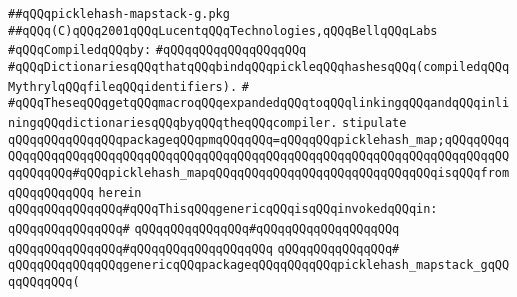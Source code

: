 \label{src/lib/compiler/front/basics/map/picklehash-mapstack-g.pkg}
\verb|##qQQqpicklehash-mapstack-g.pkg|\newline
\verb|##qQQq(C)qQQq2001qQQqLucentqQQqTechnologies,qQQqBellqQQqLabs|\newline
\newline
\verb|#qQQqCompiledqQQqby:|\newline
\verb|#qQQqqQQqqQQqqQQqqQQq|\newline
\newline
\newline
\newline
\verb|#qQQqDictionariesqQQqthatqQQqbindqQQqpickleqQQqhashesqQQq(compiledqQQqMythrylqQQqfileqQQqidentifiers).|\newline
\verb|#|\newline
\verb|#qQQqTheseqQQqgetqQQqmacroqQQqexpandedqQQqtoqQQqlinkingqQQqandqQQqinliningqQQqdictionariesqQQqbyqQQqtheqQQqcompiler.|\newline
\newline
\newline
\newline
\verb|stipulate|\newline
\verb|qQQqqQQqqQQqqQQqpackageqQQqpmqQQqqQQq=qQQqqQQqpicklehash_map;qQQqqQQqqQQqqQQqqQQqqQQqqQQqqQQqqQQqqQQqqQQqqQQqqQQqqQQqqQQqqQQqqQQqqQQqqQQqqQQqqQQqqQQq#qQQqpicklehash_mapqQQqqQQqqQQqqQQqqQQqqQQqqQQqqQQqisqQQqfromqQQqqQQqqQQq|\newline
\verb|herein|\newline
\newline
\verb|qQQqqQQqqQQqqQQq#qQQqThisqQQqgenericqQQqisqQQqinvokedqQQqin:|\newline
\verb|qQQqqQQqqQQqqQQq#|\newline
\verb|qQQqqQQqqQQqqQQq#qQQqqQQqqQQqqQQqqQQq|\newline
\verb|qQQqqQQqqQQqqQQq#qQQqqQQqqQQqqQQqqQQq|\newline
\verb|qQQqqQQqqQQqqQQq#|\newline
\verb|qQQqqQQqqQQqqQQqgenericqQQqpackageqQQqqQQqqQQqpicklehash_mapstack_gqQQqqQQqqQQq(|\newline
